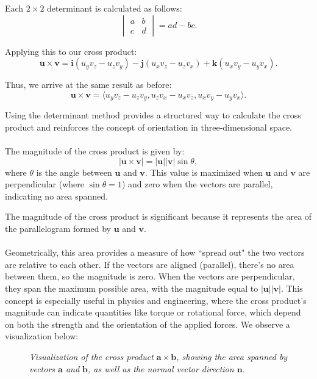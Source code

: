 Each \( 2 \times 2 \) determinant is calculated as follows:
\[
\begin{vmatrix} a & b \\ c & d \end{vmatrix} = a d - b c.
\]

Applying this to our cross product:
\[
\mathbf{u} \times \mathbf{v} = \mathbf{i} (u_y v_z - u_z v_y) - \mathbf{j} (u_x v_z - u_z v_x) + \mathbf{k} (u_x v_y - u_y v_x).
\]

Thus, we arrive at the same result as before:
\[
\mathbf{u} \times \mathbf{v} = \langle u_y v_z - u_z v_y, u_z v_x - u_x v_z, u_x v_y - u_y v_x \rangle.
\]

\noindent Using the determinant method provides a structured way to calculate the cross product and reinforces the concept of orientation in three-dimensional space. \\ \\ The magnitude of the cross product is given by:
\[
|\mathbf{u} \times \mathbf{v}| = |\mathbf{u}| |\mathbf{v}| \sin \theta,
\]
where \( \theta \) is the angle between \( \mathbf{u} \) and \( \mathbf{v} \). This value is maximized when \( \mathbf{u} \) and \( \mathbf{v} \) are perpendicular (where \( \sin \theta = 1 \)) and zero when the vectors are parallel, indicating no area spanned.

\noindent The magnitude of the cross product is significant because it represents the area of the parallelogram formed by \( \mathbf{u} \) and \( \mathbf{v} \). \\ \\ Geometrically, this area provides a measure of how ``spread out" the two vectors are relative to each other. If the vectors are aligned (parallel), there’s no area between them, so the magnitude is zero. When the vectors are perpendicular, they span the maximum possible area, with the magnitude equal to \( |\mathbf{u}| |\mathbf{v}| \). This concept is especially useful in physics and engineering, where the cross product’s magnitude can indicate quantities like torque or rotational force, which depend on both the strength and the orientation of the applied forces. We observe a visualization below:

\begin{figure}[H]
    \centering
{}
    \caption{\textit{Visualization of the cross product \( \mathbf{a} \times \mathbf{b} \), showing the area spanned by vectors \( \mathbf{a} \) and \( \mathbf{b} \), as well as the normal vector direction $\mathbf{n}$.}}
    \label{fig:cross_product_area}
\end{figure}

